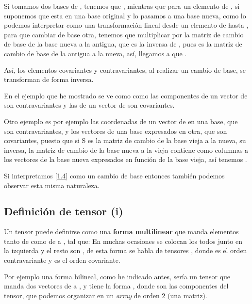Si tomamos dos bases de , tenemos que , mientras que para un elemento de , si suponemos que esta en una base original y lo pasamos a una base nueva, como lo podemos interpretar como una transformación lineal desde un elemento de  hasta \lrg{$\R$}, para que cambiar de base otra, tenemos que multiplicar por la matriz de cambio de base de la base nueva a la antigua, que es la inversa de , pues  es la matriz de cambio de base de la antigua a la nueva, así, llegamos a que .

Así, los elementos covariantes y contravariantes, al realizar un cambio de base, se transforman de forma inversa.

En el ejemplo que he mostrado se ve como como las componentes de un vector de  son contravariantes y las de un vector de  son covariantes.

Otro ejemplo es por ejemplo las coordenadas de un vector de  en una base, que son contravariantes, y los vectores de una base expresados en otra, que son covariantes, puesto que si S es la matriz de cambio de la base vieja a la nueva, su inversa, la matriz de cambio de la base nueva a la vieja contiene como columnas a los vectores de la base nueva expresados en función de la base vieja, así tenemos .

Si interpretamos \ref{1.4} como un cambio de base entonces también podemos observar esta misma naturaleza.
\subsection{Definición de tensor (i)}
Un tensor puede definirse como una \textbf{forma multilinear} que manda elementos tanto de  como de  a \lrg{$\R$}, tal que:
\lrg{\[T: V^1 \times \dots \times V^k \rightarrow \R \;\;\;\; \; V^i = \{V\mbox{ o }V^*\}\]}
En muchas ocasiones se colocan los  todos junto en la izquierda y el resto son , de esta forma se habla de tensores , donde  es el orden contravariante y  es el orden covariante.

Por ejemplo una forma bilineal, como he indicado antes, sería un tensor  que manda dos vectores de  a \lrg{$\R$}, y tiene la forma , donde  son las componentes del tensor, que podemos organizar en un \textit{array} de orden 2 (una matriz).

